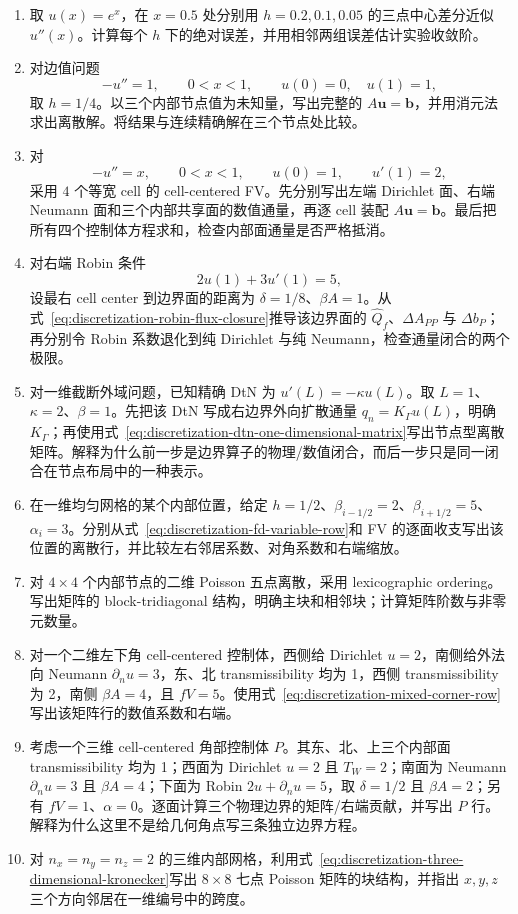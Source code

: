 \begin{enumerate}[label=\arabic*.]
\item 取 $u(x)=e^x$，在 $x=0.5$ 处分别用 $h=0.2,0.1,0.05$ 的三点中心差分近似 $u''(x)$。计算每个 $h$ 下的绝对误差，并用相邻两组误差估计实验收敛阶。
\item 对边值问题
\[
-u''=1,\qquad 0<x<1,\qquad u(0)=0,\quad u(1)=1,
\]
取 $h=1/4$。以三个内部节点值为未知量，写出完整的 $A\bm u=\bm b$，并用消元法求出离散解。将结果与连续精确解在三个节点处比较。
\item 对
\[
-u''=x,\qquad 0<x<1,\qquad u(0)=1,\qquad u'(1)=2,
\]
采用 $4$ 个等宽 cell 的 cell-centered FV。先分别写出左端 Dirichlet 面、右端 Neumann 面和三个内部共享面的数值通量，再逐 cell 装配 $A\bm u=\bm b$。最后把所有四个控制体方程求和，检查内部面通量是否严格抵消。
\item 对右端 Robin 条件
\[
2u(1)+3u'(1)=5,
\]
设最右 cell center 到边界面的距离为 $\delta=1/8$、$\beta A=1$。从式~\eqref{eq:discretization-robin-flux-closure}推导该边界面的 $\widehat Q_f$、$\Delta A_{PP}$ 与 $\Delta b_P$；再分别令 Robin 系数退化到纯 Dirichlet 与纯 Neumann，检查通量闭合的两个极限。
\item 对一维截断外域问题，已知精确 DtN 为 $u'(L)=-\kappa u(L)$。取 $L=1$、$\kappa=2$、$\beta=1$。先把该 DtN 写成右边界外向扩散通量 $q_n=K_\Gamma u(L)$，明确 $K_\Gamma$；再使用式~\eqref{eq:discretization-dtn-one-dimensional-matrix}写出节点型离散矩阵。解释为什么前一步是边界算子的物理/数值闭合，而后一步只是同一闭合在节点布局中的一种表示。
\item 在一维均匀网格的某个内部位置，给定 $h=1/2$、$\beta_{i-1/2}=2$、$\beta_{i+1/2}=5$、$\alpha_i=3$。分别从式~\eqref{eq:discretization-fd-variable-row}和 FV 的逐面收支写出该位置的离散行，并比较左右邻居系数、对角系数和右端缩放。
\item 对 $4\times4$ 个内部节点的二维 Poisson 五点离散，采用 lexicographic ordering。写出矩阵的 block-tridiagonal 结构，明确主块和相邻块；计算矩阵阶数与非零元数量。
\item 对一个二维左下角 cell-centered 控制体，西侧给 Dirichlet $u=2$，南侧给外法向 Neumann $\partial_nu=3$，东、北 transmissibility 均为 1，西侧 transmissibility 为 2，南侧 $\beta A=4$，且 $fV=5$。使用式~\eqref{eq:discretization-mixed-corner-row}写出该矩阵行的数值系数和右端。
\item 考虑一个三维 cell-centered 角部控制体 $P$。其东、北、上三个内部面 transmissibility 均为 1；西面为 Dirichlet $u=2$ 且 $T_W=2$；南面为 Neumann $\partial_nu=3$ 且 $\beta A=4$；下面为 Robin $2u+\partial_nu=5$，取 $\delta=1/2$ 且 $\beta A=2$；另有 $fV=1$、$\alpha=0$。逐面计算三个物理边界的矩阵/右端贡献，并写出 $P$ 行。解释为什么这里不是给几何角点写三条独立边界方程。
\item 对 $n_x=n_y=n_z=2$ 的三维内部网格，利用式~\eqref{eq:discretization-three-dimensional-kronecker}写出 $8\times8$ 七点 Poisson 矩阵的块结构，并指出 $x,y,z$ 三个方向邻居在一维编号中的跨度。


\end{enumerate}
